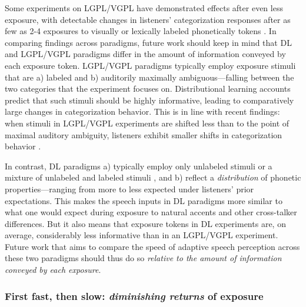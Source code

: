 \documentclass[
  11pt,
  man,mask,floatsintext]{apa6}
\begin{document}
Some experiments on LGPL/VGPL have demonstrated effects after even less exposure, with detectable changes in listeners' categorization responses after as few as 2-4 exposures to visually or lexically labeled phonetically tokens \autocite{cummings-theodore2023,kleinschmidt-jaeger2011,kleinschmidt-jaeger2012,liu-jaeger2018,liu-jaeger2019,vroomen2007}. In comparing findings across paradigms, future work should keep in mind that DL and LGPL/VGPL paradigms differ in the amount of information conveyed by each exposure token. LGPL/VGPL paradigms typically employ exposure stimuli that are a) labeled and b) auditorily maximally ambiguous---falling between the two categories that the experiment focuses on. Distributional learning accounts predict that such stimuli should be highly informative, leading to comparatively large changes in categorization behavior. This is in line with recent findings: when stimuli in LGPL/VGPL experiments are shifted less than to the point of maximal auditory ambiguity, listeners exhibit smaller shifts in categorization behavior \autocites{babel2019,kleinschmidt-jaeger2012,tzeng2021}[see also][]{cummings-theodore2023}.

In contrast, DL paradigms a) typically employ only unlabeled stimuli \autocite{clayards2008} or a mixture of unlabeled and labeled stimuli \autocite[e.g.,][ and the present paradigm]{kleinschmidt-jaeger2016}, and b) reflect a \emph{distribution} of phonetic properties---ranging from more to less expected under listeners' prior expectations. This makes the speech inputs in DL paradigms more similar to what one would expect during exposure to natural accents and other cross-talker differences. But it also means that exposure tokens in DL experiments are, on average, considerably less informative than in an LGPL/VGPL experiment. Future work that aims to compare the speed of adaptive speech perception across these two paradigms should thus do so \emph{relative to the amount of information conveyed by each exposure}.

\subsubsection{\texorpdfstring{First fast, then slow: \emph{diminishing returns} of exposure}{First fast, then slow: diminishing returns of exposure}}\label{first-fast-then-slow-diminishing-returns-of-exposure}
\end{document}
